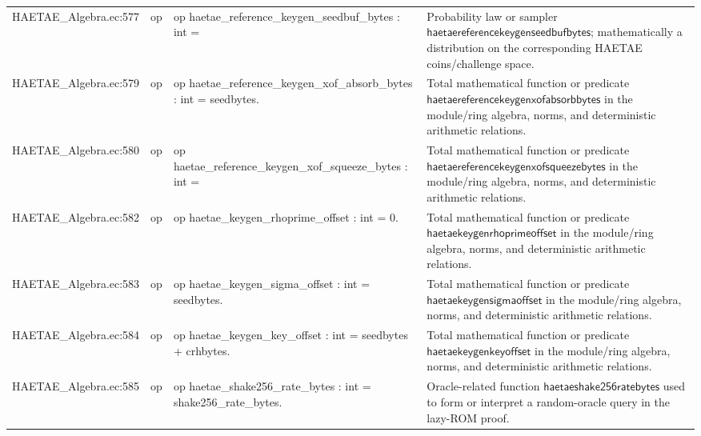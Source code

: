 \documentclass[10pt]{article}
\begin{document}
\begin{longtable}{L{0.11\textwidth}L{0.055\textwidth}L{0.385\textwidth}L{0.41\textwidth}}
HAETAE\_\allowbreak{}Algebra.\allowbreak{}ec:\allowbreak{}577 & op & {\ttfamily\scriptsize op haetae\_\allowbreak{}reference\_\allowbreak{}keygen\_\allowbreak{}seedbuf\_\allowbreak{}bytes : int =} & Probability law or sampler $\mathsf{haetaereferencekeygenseedbufbytes}$; mathematically a distribution on the corresponding HAETAE coins/challenge space. \\
HAETAE\_\allowbreak{}Algebra.\allowbreak{}ec:\allowbreak{}579 & op & {\ttfamily\scriptsize op haetae\_\allowbreak{}reference\_\allowbreak{}keygen\_\allowbreak{}xof\_\allowbreak{}absorb\_\allowbreak{}bytes : int = seedbytes.} & Total mathematical function or predicate $\mathsf{haetaereferencekeygenxofabsorbbytes}$ in the module/ring algebra, norms, and deterministic arithmetic relations. \\
HAETAE\_\allowbreak{}Algebra.\allowbreak{}ec:\allowbreak{}580 & op & {\ttfamily\scriptsize op haetae\_\allowbreak{}reference\_\allowbreak{}keygen\_\allowbreak{}xof\_\allowbreak{}squeeze\_\allowbreak{}bytes : int =} & Total mathematical function or predicate $\mathsf{haetaereferencekeygenxofsqueezebytes}$ in the module/ring algebra, norms, and deterministic arithmetic relations. \\
HAETAE\_\allowbreak{}Algebra.\allowbreak{}ec:\allowbreak{}582 & op & {\ttfamily\scriptsize op haetae\_\allowbreak{}keygen\_\allowbreak{}rhoprime\_\allowbreak{}offset : int = 0.} & Total mathematical function or predicate $\mathsf{haetaekeygenrhoprimeoffset}$ in the module/ring algebra, norms, and deterministic arithmetic relations. \\
HAETAE\_\allowbreak{}Algebra.\allowbreak{}ec:\allowbreak{}583 & op & {\ttfamily\scriptsize op haetae\_\allowbreak{}keygen\_\allowbreak{}sigma\_\allowbreak{}offset : int = seedbytes.} & Total mathematical function or predicate $\mathsf{haetaekeygensigmaoffset}$ in the module/ring algebra, norms, and deterministic arithmetic relations. \\
HAETAE\_\allowbreak{}Algebra.\allowbreak{}ec:\allowbreak{}584 & op & {\ttfamily\scriptsize op haetae\_\allowbreak{}keygen\_\allowbreak{}key\_\allowbreak{}offset : int = seedbytes + crhbytes.} & Total mathematical function or predicate $\mathsf{haetaekeygenkeyoffset}$ in the module/ring algebra, norms, and deterministic arithmetic relations. \\
HAETAE\_\allowbreak{}Algebra.\allowbreak{}ec:\allowbreak{}585 & op & {\ttfamily\scriptsize op haetae\_\allowbreak{}shake256\_\allowbreak{}rate\_\allowbreak{}bytes : int = shake256\_\allowbreak{}rate\_\allowbreak{}bytes.} & Oracle-related function $\mathsf{haetaeshake256ratebytes}$ used to form or interpret a random-oracle query in the lazy-ROM proof. \\

\end{longtable}
\end{document}
